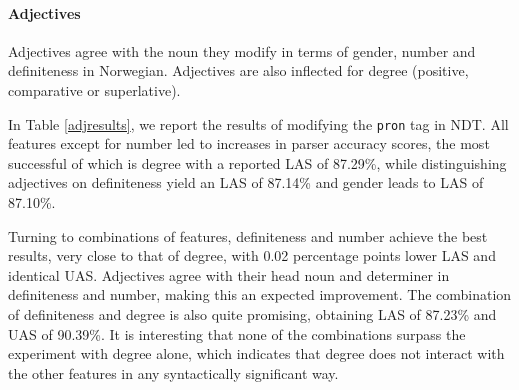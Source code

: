 \documentclass[11pt,a4paper]{article}
\begin{document}
\paragraph{Adjectives}
Adjectives agree with the noun they modify in terms of gender, number and
definiteness in Norwegian. Adjectives are also inflected for degree (positive,
comparative or superlative).

In Table \ref{adjresults}, we report the results of modifying the \texttt{pron}
tag in NDT. All features except for number led to increases in parser accuracy
scores, the most successful of which is degree with a reported LAS of 87.29\%,
while distinguishing adjectives on definiteness yield an LAS of 87.14\% and
gender leads to LAS of 87.10\%.


Turning to combinations of features, definiteness and number achieve the best
results, very close to that of degree, with 0.02 percentage points lower LAS
and identical UAS. Adjectives agree with their head noun and determiner in
definiteness and number, making this an expected improvement. The combination
of definiteness and degree is also quite promising, obtaining LAS of 87.23\%
and UAS of 90.39\%. It is interesting that none of the combinations surpass the
experiment with degree alone, which indicates that degree does not interact
with the other features in any syntactically significant way.
\end{document}
